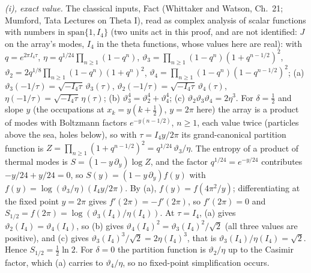 \emph{(i), exact value.} The classical inputs, Fact  (Whittaker and Watson, Ch.~21; Mumford, Tata Lectures on Theta I), read as complex analysis of scalar functions with numbers in $\mathrm{span}\{1, I_4\}$ (two units act in this proof, and are not identified: $J$ on the array's modes, $I_4$ in the theta functions, whose values here are real): with $q = e^{2\pi I_4\tau}$, $\eta = q^{1/24}\prod_{n \geq 1}(1 - q^{n})$, $\vartheta_{3} = \prod_{n \geq 1}(1 - q^{n})(1 + q^{n - 1/2})^{2}$, $\vartheta_{2} = 2q^{1/8}\prod_{n \geq 1}(1 - q^{n})(1 + q^{n})^{2}$, $\vartheta_{4} = \prod_{n \geq 1}(1 - q^{n})(1 - q^{n - 1/2})^{2}$; (a) $\vartheta_{3}(-1/\tau) = \sqrt{-I_4\tau}\,\vartheta_{3}(\tau)$, $\vartheta_{2}(-1/\tau) = \sqrt{-I_4\tau}\,\vartheta_{4}(\tau)$, $\eta(-1/\tau) = \sqrt{-I_4\tau}\,\eta(\tau)$; (b) $\vartheta_{3}^{4} = \vartheta_{2}^{4} + \vartheta_{4}^{4}$; (c) $\vartheta_{2}\vartheta_{3}\vartheta_{4} = 2\eta^{3}$. For $\delta = \tfrac12$ and slope $y$ (the occupations at $x_{k} = y(k + \tfrac12)$, $y = 2\pi$ here) the array is a product of modes with Boltzmann factors $e^{-y(n - 1/2)}$, $n \geq 1$, each value twice (particles above the sea, holes below), so with $\tau = I_4y/2\pi$ its grand-canonical partition function is $Z = \prod_{n \geq 1}(1 + q^{n - 1/2})^{2} = q^{1/24}\,\vartheta_{3}/\eta$. The entropy of a product of thermal modes is $S = (1 - y\,\partial_{y})\log Z$, and the factor $q^{1/24} = e^{-y/24}$ contributes $-y/24 + y/24 = 0$, so $S(y) = (1 - y\,\partial_{y})f(y)$ with $f(y) = \log(\vartheta_{3}/\eta)(I_4y/2\pi)$. By (a), $f(y) = f(4\pi^{2}/y)$; differentiating at the fixed point $y = 2\pi$ gives $f'(2\pi) = -f'(2\pi)$, so $f'(2\pi) = 0$ and $S_{1/2} = f(2\pi) = \log(\vartheta_{3}(I_4)/\eta(I_4))$. At $\tau = I_4$, (a) gives $\vartheta_{2}(I_4) = \vartheta_{4}(I_4)$, so (b) gives $\vartheta_{4}(I_4)^{2} = \vartheta_{3}(I_4)^{2}/\sqrt{2}$ (all three values are positive), and (c) gives $\vartheta_{3}(I_4)^{3}/\sqrt{2} = 2\eta(I_4)^{3}$, that is $\vartheta_{3}(I_4)/\eta(I_4) = \sqrt{2}$. Hence $S_{1/2} = \tfrac12\ln 2$. For $\delta = 0$ the partition function is $\vartheta_{2}/\eta$ up to the Casimir factor, which (a) carries to $\vartheta_{4}/\eta$, so no fixed-point simplification occurs.
